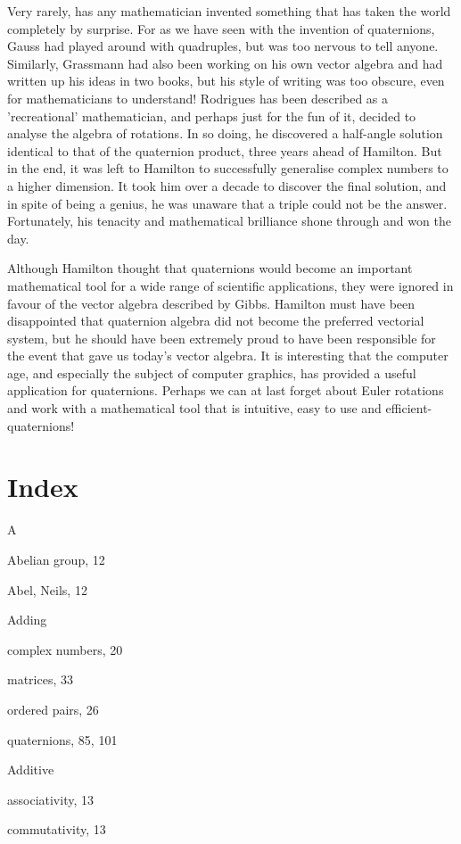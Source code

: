 \documentclass[10pt]{article}
\begin{document}
Very rarely, has any mathematician invented something that has taken the world completely by surprise. For as we have seen with the invention of quaternions, Gauss had played around with quadruples, but was too nervous to tell anyone. Similarly, Grassmann had also been working on his own vector algebra and had written up his ideas in two books, but his style of writing was too obscure, even for mathematicians to understand! Rodrigues has been described as a 'recreational' mathematician, and perhaps just for the fun of it, decided to analyse the algebra of rotations. In so doing, he discovered a half-angle solution identical to that of the quaternion product, three years ahead of Hamilton. But in the end, it was left to Hamilton to successfully generalise complex numbers to a higher dimension. It took him over a decade to discover the final solution, and in spite of being a genius, he was unaware that a triple could not be the answer. Fortunately, his tenacity and mathematical brilliance shone through and won the day.

Although Hamilton thought that quaternions would become an important mathematical tool for a wide range of scientific applications, they were ignored in favour of the vector algebra described by Gibbs. Hamilton must have been disappointed that quaternion algebra did not become the preferred vectorial system, but he should have been extremely proud to have been responsible for the event that gave us today's vector algebra. It is interesting that the computer age, and especially the subject of computer graphics, has provided a useful application for quaternions. Perhaps we can at last forget about Euler rotations and work with a mathematical tool that is intuitive, easy to use and efficient-quaternions!

\section{Index}
A

Abelian group, 12

Abel, Neils, 12

Adding

complex numbers, 20

matrices, 33

ordered pairs, 26

quaternions, 85, 101

Additive

associativity, 13

commutativity, 13
\end{document}
